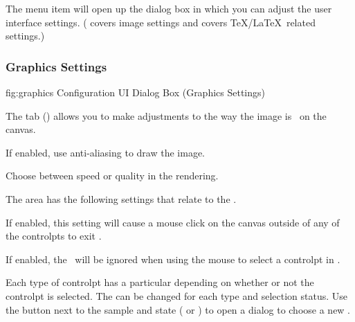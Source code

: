 
The menu item  will open up 
the  dialog box
in which you can adjust the user interface settings.
( covers image settings
and  covers \TeX\slash\LaTeX\ related
settings.)


\subsubsection{Graphics Settings}\label{sec:graphics}


\FloatFig
  {fig:graphics}
  {}
  {Configuration UI Dialog Box (Graphics Settings)}

The  tab ()
allows you to make adjustments to the way the image is
\rendered\ on the \gls{canvas}.


If enabled, use \gls{anti-aliasing} to draw the image.


Choose between speed or quality in the \gls{rendering}.


The  area has the following settings that
relate to the \editpathmode.


If enabled, this setting will cause a mouse \gls{click} on the
\gls{canvas} outside of any of the \glspl{controlpt} to exit
\editpathmode.


If enabled, the \gridlock\ will be ignored when using the
mouse to select a \gls{controlpt} in \editpathmode.

Each type of \gls{controlpt} has a particular 
depending on whether or not the \gls{controlpt} is selected.  The
 can be changed for each type and selection status.
Use the  button next to the sample and state
( or
) to open a  dialog
to choose a new .


